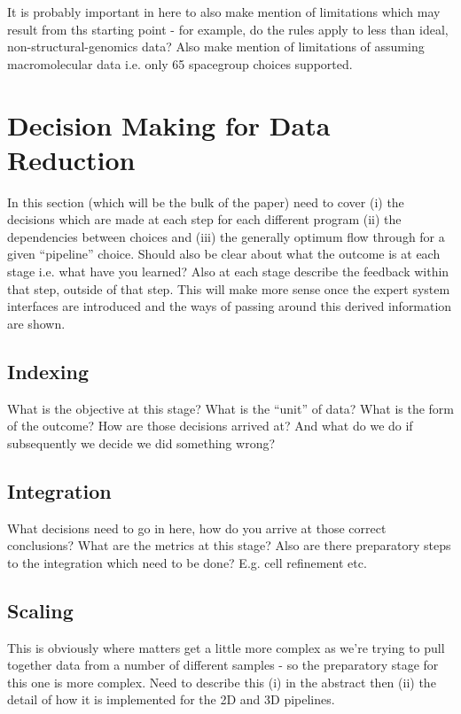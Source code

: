 \documentclass[a4paper,11pt]{article}
\begin{document}
It is probably important in here to also make mention of limitations
which may result from ths starting point - for example, do the rules
apply to less than ideal, non-structural-genomics data? Also make
mention of limitations of assuming macromolecular data i.e. only 65
spacegroup choices supported.

\section{Decision Making for Data Reduction}

In this section (which will be the bulk of the paper) need to cover
(i) the decisions which are made at each step for each different
program (ii) the dependencies between choices and (iii) the generally
optimum flow through for a given ``pipeline'' choice. Should also be
clear about what the outcome is at each stage i.e. what have you
learned? Also at each stage describe the feedback within that step,
outside of that 
step. This will make more sense once the expert system interfaces are
introduced and the ways of passing around this derived information are shown.

\subsection{Indexing}

What is the objective at this stage? What is the ``unit'' of data?
What is the form of the outcome? How are those decisions arrived at?
And what do we do if subsequently we decide we did something wrong?

\subsection{Integration}

What decisions need to go in here, how do you arrive at those correct
conclusions? What are the metrics at this stage? Also are there
preparatory steps to the integration which need to be done? E.g. cell
refinement etc.

\subsection{Scaling}

This is obviously where matters get a little more complex as we're
trying to pull together data from a number of different samples - so
the preparatory stage for this one is more complex. Need to describe
this (i) in the abstract then (ii) the detail of how it is implemented
for the 2D and 3D pipelines.
\end{document}
